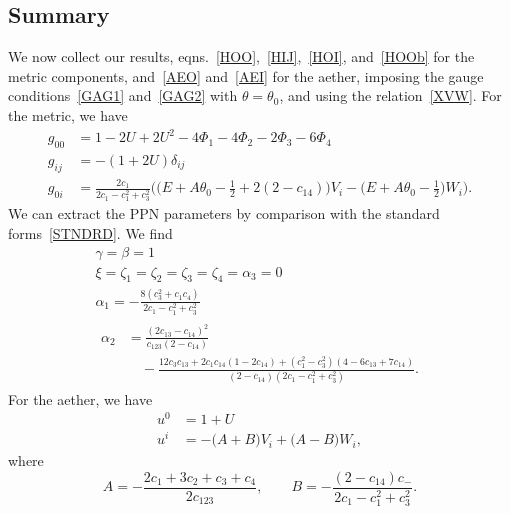 \documentclass[aps,prd,preprint,amsmath,amssymb]{revtex4}
\def\beq{\begin{equation}}
\def\eeq{\end{equation}}
\def\half{\frac{1}{2}}
\begin{document}
\subsection{Summary}
%
We now collect our results,
eqns.~\eqref{HOO},~\eqref{HIJ},~\eqref{HOI}, and~\eqref{HOOb} for
the metric components, and~\eqref{AEO} and~\eqref{AEI} for the
aether, imposing the gauge conditions~\eqref{GAG1}
and~\eqref{GAG2} with $\theta=\theta_0$, and using the
relation~\eqref{XVW}. For the metric, we have
%
\begin{align}
    g_{00} &=1-2U+2U^2-4\Phi_1 -4\Phi_2 -2\Phi_3-6\Phi_4\\
    g_{ij} &=-(1+2U)\delta_{ij}\\
    g_{0i} &= \frac{2 c_1}{2c_1 -c_1^2+c_3^2}\Big(
        \big(E+A\theta_0-\half+2(2-c_{14})\big)V_i
        -\big(E+A\theta_0-\half\big)W_i\Big).
\end{align}
%
We can extract the PPN parameters by comparison with the standard
forms~\eqref{STNDRD}. We find
%
\begin{gather}
    \gamma = \beta = 1\\
    \xi = \zeta_1=\zeta_2=\zeta_3=\zeta_4=\alpha_3 = 0\\
    \alpha_1= -\frac{8(c_3^2 + c_1c_4)}{2c_1 - c_1^2+c_3^2}\\
\begin{split}
    \alpha_2&= \frac{(2c_{13}-c_{14})^2}{c_{123}(2-c_{14})}\\
    &\quad
        -\frac{12c_3c_{13}+2c_1c_{14}(1-2c_{14})+
        (c_1^2-c_3^2)(4-6c_{13}+7c_{14})} {(2-c_{14})(2c_1 -
        c_1^2+c_3^2)}.
\end{split}
\end{gather}
%
For the aether, we have
%
\begin{align}
    u^0 &= 1 + U\\
    u^i & = -\big(A+B\big)V_i + \big(A-B) W_i,
\end{align}
%
where
%
\beq
    A = -\frac{2c_1+3c_2+c_3+c_4}{2c_{123}},\qquad
    B = -\frac{(2-c_{14})c_-}{2c_1-c_1^2+c_3^2}.
\eeq
%
%
\end{document}
